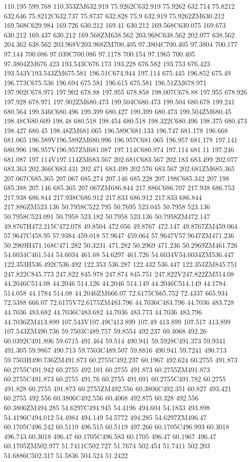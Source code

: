 110.195 599.768 110.353ZM632.919 75.9262C632.919 75.9262 632.714 75.8212 632.646 75.8212C632.737 75.8737 632.828 75.9 632.919 75.9262ZM630.212 169.568C629.984 169.726 630.212 169.41 630.212 169.568C630.075 169.673 630.212 169.437 630.212 169.568ZM638.562 203.968C638.562 202.077 638.562 204.362 638.562 203.968V203.968ZM700.405 97.3804C700.405 97.3804 700.177 97.144 700.086 97.039C700.086 97.1178 700.154 97.1965 700.405 97.3804ZM676.423 193.543C676.173 193.228 676.582 193.753 676.423 193.543V193.543ZM675.581 196.51C674.944 197.114 675.445 196.852 675.49 196.773C675.536 196.694 675.581 196.615 675.581 196.51ZM678.971 197.902C678.971 197.902 678.88 197.955 678.858 198.007C678.88 197.955 678.926 197.928 678.971 197.902ZM680.473 199.504C680.473 199.504 680.678 199.241 680.564 199.346C680.496 199.399 680.427 199.399 680.473 199.504ZM680.45 198.48C680.609 198.48 680.518 198.454 680.518 198.322C680.496 198.375 680.473 198.427 680.45 198.48ZM681.065 196.589C681.133 196.747 681.178 196.668 681.065 196.589V196.589ZM680.996 196.957C681.065 196.957 681.178 197.141 680.996 196.957V196.957ZM681.087 197.114C680.974 197.114 681.11 197.246 681.087 197.114V197.114ZM683.567 202.681C683.567 202.183 683.499 202.077 683.363 202.366C683.431 202.471 683.499 202.576 683.567 202.681ZM685.365 207.067C685.365 207.067 685.274 207.146 685.228 207.198C685.342 207.198 685.388 207.146 685.365 207.067ZM686.844 217.886C686.707 217.938 686.753 217.938 686.844 217.938C686.912 217.833 686.912 217.833 686.844 217.886ZM523.136 50.7958C522.795 50.7695 523.045 50.7958 523.136 50.7958C523.091 50.7958 523.182 50.7958 523.136 50.7958ZM472.147 49.8767H472.215C472.078 49.8504 472.056 49.8767 472.147 49.8767ZM459.064 57.9647C458.95 57.9384 459.018 57.9647 459.064 57.9647V57.9647ZM471.236 50.2969H471.168C471.282 50.3231 471.282 50.2969 471.236 50.2969ZM461.726 54.6034C461.544 54.6034 461.68 54.6297 461.726 54.6034V54.6034ZM536.447 122.353H536.492C536.492 122.353 536.287 122.432 536.447 122.353ZM845.751 247.822C845.773 247.822 845.978 247.874 845.751 247.822V247.822ZM514.08 44.2046C514.08 44.2046 514.126 44.2046 514.149 44.2046C514.149 44.1784 514.058 44.1784 514.08 44.2046ZM666.07 72.6175C665.752 72.4337 665.934 72.5388 666.07 72.6175V72.6175ZM483.796 44.7036C483.796 44.7036 483.728 44.7036 483.682 44.7036C483.682 44.7036 483.773 44.7036 483.796 44.7036ZM413.899 107.543V107.49C413.899 107.49 413.899 107.517 413.899 107.543ZM490.736 59.7503C489.757 59.8554 492.237 60.4068 492.26 60.0392C491.896 59.6715 491.464 59.514 490.941 59.5928C491.373 59.9341 491.305 59.9867 490.713 59.7503C489.507 59.8816 490.941 59.7241 490.713 59.7503H490.736ZM491.873 60.2755C492.237 60.1967 492.624 60.2755 491.873 60.2755C491.942 60.2755 492.101 60.2755 491.873 60.2755ZM491.873 60.2755C491.873 60.2755 491.76 60.2755 491.691 60.2755C491.782 60.2755 491.828 60.2755 491.873 60.2755ZM492.556 60.3806C492.351 60.827 493.421 60.2755 492.556 60.3806C492.556 60.4068 492.875 60.328 492.556 60.3806ZM494.285 54.6297C494.945 54.4196 494.604 54.1833 493.898 54.4196C494.012 54.4984 494.149 54.5772 494.285 54.6297ZM496.47 60.1705C496.242 60.5119 496.515 60.5119 497.266 60.1705C496.993 60.3018 496.743 60.3018 496.47 60.1705C496.583 60.1705 496.47 60.1967 496.47 60.1705ZM502.977 51.7411C502.727 51.7674 502.454 51.7411 502.203 51.6886C502.317 51.5836 504.524 51.2422 